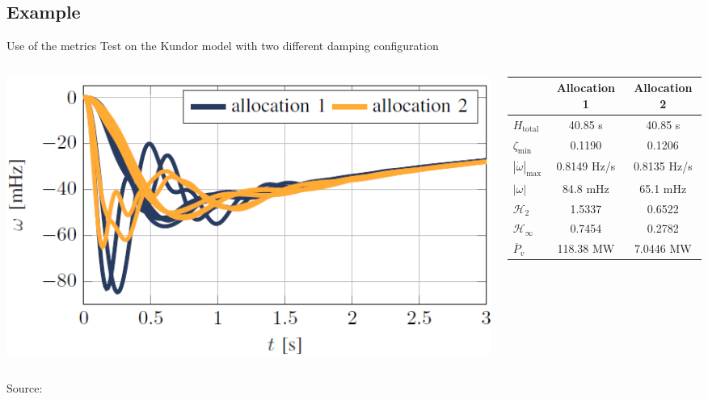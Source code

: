 \documentclass[aspectratio=169, 12pt]{beamer}
\begin{document}
\subsection{Example}
\begin{frame}{Use of the metrics}
  Test on the Kundor model with two different damping configuration
  \begin{columns}
    \begin{column}{0.5\columnwidth}
      \includegraphics[width = \columnwidth]{figure/kundor_frequency.png}
    \end{column}
    \begin{column}{0.5\columnwidth}
      \begin{table}[h!]
        \centering
        \begin{tabular}{lcc}
        \toprule
        & Allocation 1 & Allocation 2 \\
        \midrule
        $H_{\text{total}}$ & 40.85 s & 40.85 s \\
        $\zeta_{\text{min}}$ & 0.1190 & 0.1206 \\
        $\left|\dot{\omega}\right|_{\max}$ & 0.8149 Hz/s & 0.8135 Hz/s \\
        $\left|\omega\right|$ & 84.8 mHz & 65.1 mHz \\
        $\mathcal{H}_2 $ & 1.5337 & 0.6522 \\
        $\mathcal{H}_{\infty} $ & 0.7454 & 0.2782 \\
        $\overline{P}_v$ & 118.38 MW & 7.0446 MW \\
        \bottomrule
        \end{tabular}
      
        \label{table:allocations}
        \end{table}
    \end{column}
  \end{columns}

  {\tiny Source: \cite{Increasing_the_Resilience}}
\end{frame}
\end{document}

